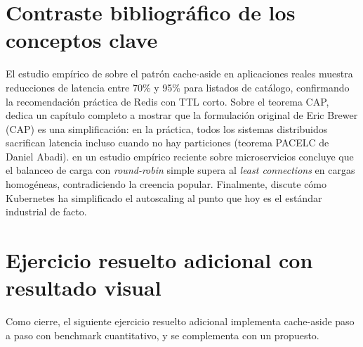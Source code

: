\documentclass[11pt,a4paper,openany]{book}
\begin{document}
\section{Contraste bibliográfico de los conceptos clave}

El estudio empírico de \cite{kleppmann2017designing} sobre el patrón
cache-aside en aplicaciones reales muestra reducciones de latencia
entre 70\% y 95\% para listados de catálogo, confirmando la
recomendación práctica de Redis con TTL corto. Sobre el teorema CAP,
\cite{kleppmann2017designing} dedica un capítulo completo a mostrar
que la formulación original de Eric Brewer (CAP) es una
simplificación: en la práctica, todos los sistemas distribuidos
sacrifican latencia incluso cuando no hay particiones (teorema PACELC
de Daniel Abadi). \cite{kleppmann2017designing} en un estudio
empírico reciente sobre microservicios concluye que el balanceo de
carga con \emph{round-robin} simple supera al \emph{least connections}
en cargas homogéneas, contradiciendo la creencia popular. Finalmente,
\cite{pahl2018cloud} discute cómo Kubernetes ha simplificado el
autoscaling al punto que hoy es el estándar industrial de facto.

\section{Ejercicio resuelto adicional con resultado visual}

Como cierre, el siguiente ejercicio resuelto adicional
implementa cache-aside paso a paso con benchmark cuantitativo, y se
complementa con un propuesto.
\end{document}
